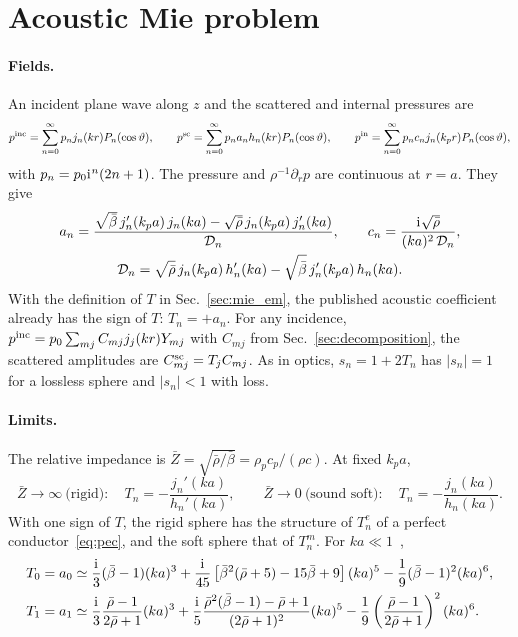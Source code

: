 \documentclass[
    pra,
    aps,
    reprint,
    onecolumn,
    amsmath,amssymb,
    a4paper,
    superscriptaddress,
    10pt,
    nofootinbib
]{revtex4-2}
\newcommand{\iu}{\mathrm{i}\mkern1mu}                 %
\newcommand{\rb}{\bar{\rho}}
\newcommand{\bb}{\bar{\beta}}
\begin{document}
\section{Acoustic Mie problem}
\label{sec:acoustics}

\paragraph{Fields.}
An incident plane wave along $z$ and the scattered and internal pressures are~\cite{Toftul2019PRL,Thesis}
\begin{equation}
    p^{\rm inc} = \sum_{n=0}^\infty p_n j_n(kr)P_n(\cos\vartheta), \qquad
    p^{\rm sc} = \sum_{n=0}^\infty p_n a_n h_n(kr)P_n(\cos\vartheta), \qquad
    p^{\rm in} = \sum_{n=0}^\infty p_n c_n j_n(k_p r)P_n(\cos\vartheta),
    \label{eq:acoustic_fields}
\end{equation}
with $p_n = p_0\iu^n(2n+1)$.
The pressure and $\rho^{-1}\partial_r p$ are continuous at $r = a$.
They give~\cite{Toftul2019PRL,Thesis}
\begin{gather}
    a_n = \frac{\sqrt{\bb}\, j_n'(k_pa)\, j_n(ka) - \sqrt{\rb}\, j_n(k_pa)\, j_n'(ka)}{\mathcal{D}_n}, \qquad
    c_n = \frac{\iu\sqrt{\rb}}{(ka)^2\, \mathcal{D}_n},
    \nonumber \\
    \mathcal{D}_n = \sqrt{\rb}\, j_n(k_pa)\, h_n'(ka) - \sqrt{\bb}\, j_n'(k_pa)\, h_n(ka).
    \label{eq:acoustic_coefficients}
\end{gather}
With the definition of $T$ in Sec.~\ref{sec:mie_em}, the published acoustic coefficient already has the sign of $T$: $T_n = +a_n$.
For any incidence, $p^{\rm inc} = p_0\sum_{mj}C_{mj}j_j(kr)Y_{mj}$ with $C_{mj}$ from Sec.~\ref{sec:decomposition}, the scattered amplitudes are $C^{\rm sc}_{mj} = T_j C_{mj}$.
As in optics, $s_n = 1 + 2T_n$ has $|s_n| = 1$ for a lossless sphere and $|s_n| < 1$ with loss.

\paragraph{Limits.}
The relative impedance is $\bar{Z} = \sqrt{\rb/\bb} = \rho_pc_p/(\rho c)$.
At fixed $k_pa$,
\begin{equation}
    \bar{Z} \to \infty\ \text{(rigid)}: \quad T_n = -\frac{j_n'(ka)}{h_n'(ka)}, \qquad
    \bar{Z} \to 0\ \text{(sound soft)}: \quad T_n = -\frac{j_n(ka)}{h_n(ka)} .
    \label{eq:acoustic_limits}
\end{equation}
With one sign of $T$, the rigid sphere has the structure of $T^e_n$ of a perfect conductor~\eqref{eq:pec}, and the soft sphere that of $T^m_n$.
For $ka \ll 1$~\cite{Thesis},
\begin{align}
    T_0 = a_0 &\simeq \frac{\iu}{3}(\bb - 1)(ka)^3 + \frac{\iu}{45}\left[\bb^2(\rb + 5) - 15\bb + 9\right](ka)^5 - \frac{1}{9}(\bb - 1)^2(ka)^6, \nonumber \\
    T_1 = a_1 &\simeq \frac{\iu}{3}\frac{\rb - 1}{2\rb + 1}(ka)^3 + \frac{\iu}{5}\frac{\rb^2(\bb - 1) - \rb + 1}{(2\rb + 1)^2}(ka)^5 - \frac{1}{9}\left(\frac{\rb - 1}{2\rb + 1}\right)^2(ka)^6 .
    \label{eq:acoustic_small}
\end{align}
\end{document}
